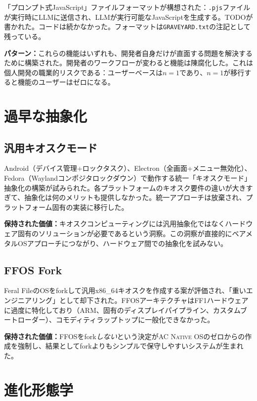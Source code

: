 \documentclass[10pt,letterpaper,twocolumn]{article}
\newcommand{\acos}{\textsc{AC Native OS}}
\begin{document}
「プロンプト式JavaScript」ファイルフォーマットが構想された：\texttt{.pjs}ファイルが実行時にLLMに送信され、LLMが実行可能なJavaScriptを生成する。TODOが書かれた。コードは続かなかった。フォーマットは\texttt{GRAVEYARD.txt}の注記として残っている。

\textbf{パターン：}これらの機能はいずれも、開発者自身だけが直面する問題を解決するために構築された。開発者のワークフローが変わると機能は陳腐化した。これは個人開発の職業的リスクである：ユーザーベースは$n=1$であり、$n=1$が移行すると機能のユーザーはゼロになる。

\section{過早な抽象化}

\subsection{汎用キオスクモード}

Android（デバイス管理+ロックタスク）、Electron（全画面+メニュー無効化）、Fedora（Waylandコンポジタロックダウン）で動作する統一「キオスクモード」抽象化の構築が試みられた。各プラットフォームのキオスク要件の違いが大きすぎて、抽象化は何のメリットも提供しなかった。統一アプローチは放棄され、プラットフォーム固有の実装に移行した。

\textbf{保持された価値：}キオスクコンピューティングには汎用抽象化ではなくハードウェア固有のソリューションが必要であるという洞察。この洞察が直接的にベアメタルOSアプローチにつながり、ハードウェア間での抽象化を試みない。

\subsection{FFOS Fork}

Feral FileのOSをforkして汎用x86\_64キオスクを作成する案が評価され、「重いエンジニアリング」として却下された。FFOSアーキテクチャはFF1ハードウェアに過度に特化しており（ARM、固有のディスプレイパイプライン、カスタムブートローダー）、コモディティラップトップに一般化できなかった。

\textbf{保持された価値：}FFOSをfork\emph{しない}という決定が\acos{}のゼロからの作成を強制し、結果としてforkよりもシンプルで保守しやすいシステムが生まれた。

\section{進化形態学}
\end{document}
